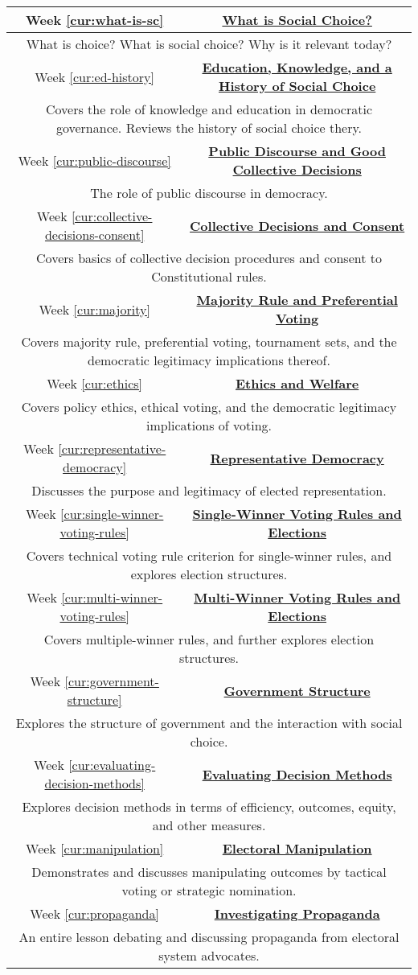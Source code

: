 {
\newcommand{\sylweek}[3]{

    Week \ref{cur:#1} & \textbf{\hyperref[cur:#1]{#2}} \\
    \hline
    \multicolumn{2}{|X|}{\centering
        #3
    } \\
    \hline
}
\begin{table}[h]
    \label{syllabus}
    \centering
    \begin{tabularx}{\linewidth}{|c|c|}
        \hline

        \sylweek{what-is-sc}{What is Social Choice?}{What is choice?  What is social choice?  Why is it relevant today?}

        \sylweek{ed-history}{Education, Knowledge, and a History of Social Choice}{Covers the role of knowledge and education in democratic governance.  Reviews the history of social choice thery.}

        \sylweek{public-discourse}{Public Discourse and Good Collective Decisions}{The role of public discourse in democracy.}

        \sylweek{collective-decisions-consent}{Collective Decisions and Consent}{Covers basics of collective decision procedures and consent to  Constitutional rules.}

        \sylweek{majority}{Majority Rule and Preferential Voting}{Covers majority rule, preferential voting, tournament sets, and the democratic legitimacy implications thereof.}

        \sylweek{ethics}{Ethics and Welfare}{Covers policy ethics, ethical voting, and the democratic legitimacy implications of voting.}

        \sylweek{representative-democracy}{Representative Democracy}{Discusses the purpose and legitimacy of elected representation.}

        \sylweek{single-winner-voting-rules}{Single-Winner Voting Rules and Elections}{Covers technical voting rule criterion for single-winner rules, and explores election structures.}

        \sylweek{multi-winner-voting-rules}{Multi-Winner Voting Rules and Elections}{Covers multiple-winner rules, and further explores election structures.}

        \sylweek{government-structure}{Government Structure}{Explores the structure of government and the interaction with social choice.}

        \sylweek{evaluating-decision-methods}{Evaluating Decision Methods}{Explores decision methods in terms of efficiency, outcomes, equity, and other measures.}

        \sylweek{manipulation}{Electoral Manipulation}{Demonstrates and discusses manipulating outcomes by tactical voting or strategic nomination.}

        \sylweek{propaganda}{Investigating Propaganda}{An entire lesson debating and discussing propaganda from electoral system advocates.}
    \end{tabularx}
\end{table}
}


